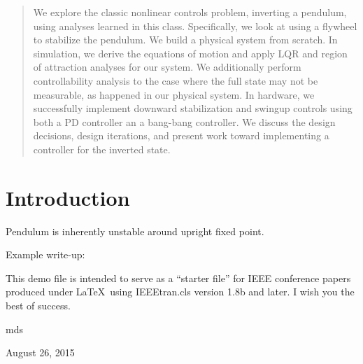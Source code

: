 \documentclass[conference]{IEEEtran}
\begin{document}
\begin{abstract}
We explore the classic nonlinear controls problem, inverting a pendulum, using analyses learned in this class. Specifically, we look at using a flywheel to stabilize the pendulum. We build a physical system from scratch. In simulation, we derive the equations of motion and apply LQR and region of attraction analyses for our system. We additionally perform controllability analysis to the case where the full state may not be measurable, as happened in our physical system. In hardware, we successfully implement downward stabilization and swingup controls using both a PD controller an a bang-bang controller. We discuss the design decisions, design iterations, and present work toward implementing a controller for the inverted state.
\end{abstract}





%
\IEEEpeerreviewmaketitle



\section{Introduction}
Pendulum is inherently unstable around upright fixed point.


Example write-up:

This demo file is intended to serve as a ``starter file''
for IEEE conference papers produced under \LaTeX\ using
IEEEtran.cls version 1.8b and later.
I wish you the best of success.

\hfill mds

\hfill August 26, 2015

\end{document}
